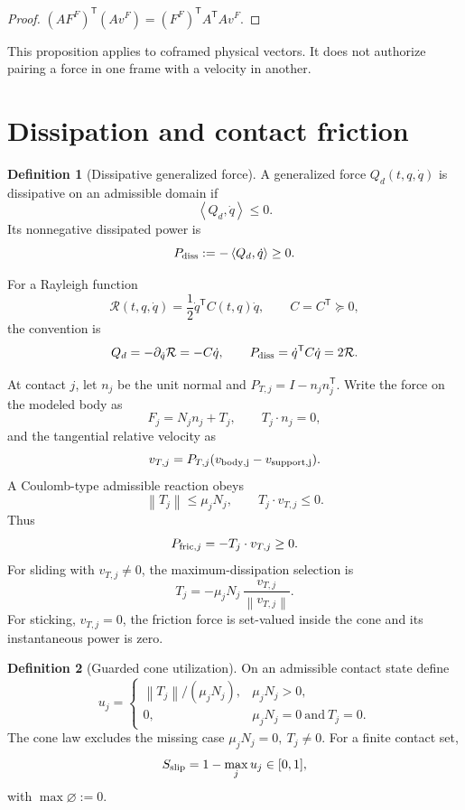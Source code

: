 \documentclass[11pt,a4paper]{article}
\theoremstyle{definition}
\newtheorem{definition}{Definition}[section]
\theoremstyle{plain}
\theoremstyle{remark}
\newcommand{\norm}[1]{\left\lVert #1\right\rVert}
\newcommand{\pair}[2]{\left\langle #1,#2\right\rangle}
\newcommand{\Rcal}{\mathcal R}
\begin{document}
\begin{proof}
\((AF^F)^{\mathsf T}(Av^F)
=(F^F)^{\mathsf T}A^{\mathsf T}Av^F\).
\end{proof}

This proposition applies to coframed physical vectors. It does not
authorize pairing a force in one frame with a velocity in another.

\section{Dissipation and contact friction}

\begin{definition}[Dissipative generalized force]
A generalized force \(Q_d(t,q,\dot q)\) is dissipative on an
admissible domain if
\[
\pair{Q_d}{\dot q}\le0.
\]
Its nonnegative dissipated power is
\begin{equation}\label{eq:pdiss}
P_{\rm diss}:=-\pair{Q_d}{\dot q}\ge0.
\end{equation}
\end{definition}

For a Rayleigh function
\[
\Rcal(t,q,\dot q)=\frac12\dot q^{\mathsf T}C(t,q)\dot q,
\qquad C=C^{\mathsf T}\succeq0,
\]
the convention is
\[
Q_d=-\partial_{\dot q}\Rcal=-C\dot q,\qquad
P_{\rm diss}=\dot q^{\mathsf T}C\dot q=2\Rcal.
\]

At contact \(j\), let \(n_j\) be the unit normal and
\(P_{T,j}=I-n_jn_j^{\mathsf T}\). Write the force on the modeled body
as
\[
F_j=N_jn_j+T_j,\qquad T_j\cdot n_j=0,
\]
and the tangential relative velocity as
\[
v_{T,j}=P_{T,j}(v_{\rm body,j}-v_{\rm support,j}).
\]
A Coulomb-type admissible reaction obeys
\begin{equation}\label{eq:coulomb}
\norm{T_j}\le\mu_jN_j,\qquad
T_j\cdot v_{T,j}\le0.
\end{equation}
Thus
\begin{equation}\label{eq:friction-power}
P_{{\rm fric},j}=-T_j\cdot v_{T,j}\ge0.
\end{equation}
For sliding with \(v_{T,j}\ne0\), the maximum-dissipation selection is
\[
T_j=-\mu_jN_j\,\frac{v_{T,j}}{\norm{v_{T,j}}}.
\]
For sticking, \(v_{T,j}=0\), the friction force is set-valued inside
the cone and its instantaneous power is zero.

\begin{definition}[Guarded cone utilization]
On an admissible contact state define
\[
u_j=
\begin{cases}
\norm{T_j}/(\mu_jN_j),&\mu_jN_j>0,\\
0,&\mu_jN_j=0\ \text{and}\ T_j=0.
\end{cases}
\]
The cone law excludes the missing case
\(\mu_jN_j=0,\ T_j\ne0\). For a finite contact set,
\[
S_{\rm slip}=1-\max_j u_j\in[0,1],
\]
with \(\max\varnothing:=0\).
\end{definition}
\end{document}
